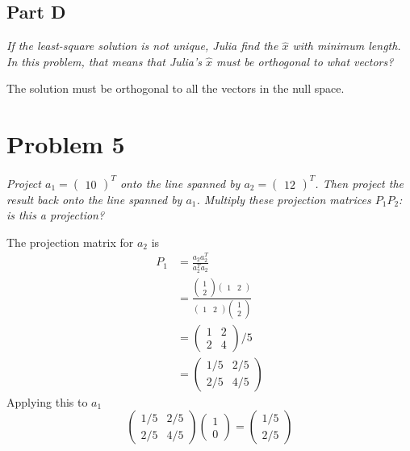 \documentclass{article}
\begin{document}
\subsection*{Part D}

\textit{If the least-square solution is not unique, Julia find the $\hat{x}$
with minimum length. In this problem, that means that Julia's $\hat{x}$ must
be orthogonal to what vectors?}

\bigbreak

The solution must be orthogonal to all the vectors in the null space.

\section*{Problem 5}

\textit{Project $a_1 = \begin{pmatrix} 1 0 \end{pmatrix}^T$ onto the line
spanned by $a_2 = \begin{pmatrix} 1 2 \end{pmatrix}^T$. Then project the
result back onto the line spanned by $a_1$. Multiply these projection
matrices $P_1P_2$: is this a projection?}

\bigbreak

The projection matrix for $a_2$ is
\begin{align*}
    P_1 &= \frac{a_2 a_2^T}{a_2^T a_2} \\
    &= \frac{\begin{pmatrix} 1 \\ 2 \end{pmatrix} \begin{pmatrix} 1 & 2 \end{pmatrix}}{\begin{pmatrix} 1 & 2 \end{pmatrix} \begin{pmatrix} 1 \\ 2 \end{pmatrix}} \\
    &= \begin{pmatrix} 1 & 2 \\ 2 & 4 \end{pmatrix} / 5 \\
    &= \begin{pmatrix}
        1/5 & 2/5 \\
        2/5 & 4/5
    \end{pmatrix}
\end{align*}
Applying this to $a_1$
$$ \begin{pmatrix}
    1/5 & 2/5 \\
    2/5 & 4/5
\end{pmatrix} \begin{pmatrix}
    1 \\
    0
\end{pmatrix} = \begin{pmatrix}
    1/5 \\
    2/5
\end{pmatrix} $$
\end{document}
